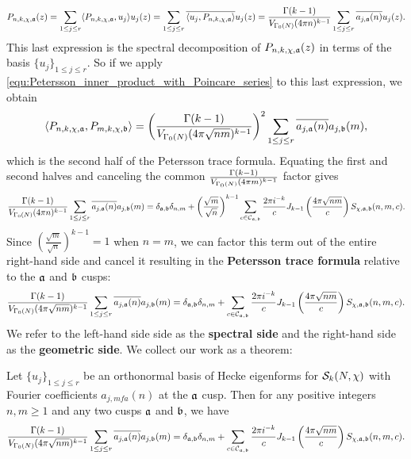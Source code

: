     \[
      P_{n,k,\chi,\mathfrak{a}}(z) = \sum_{1 \le j \le r}\langle P_{n,k,\chi,\mathfrak{a}},u_{j}\rangle u_{j}(z) = \sum_{1 \le j \le r}\overline{\langle u_{j},P_{n,k,\chi,\mathfrak{a}}\rangle}u_{j}(z) = \frac{\Gamma(k-1)}{V_{\Gamma_{0}(N)}(4\pi n)^{k-1}}\sum_{1 \le j \le r}\overline{a_{j,\mathfrak{a}}(n)}u_{j}(z).
    \]
    This last expression is the spectral decomposition of $P_{n,k,\chi,\mathfrak{a}}(z)$ in terms of the basis $\{u_{j}\}_{1 \le j \le r}$. So if we apply \cref{equ:Petersson_inner_product_with_Poincare_series} to this last expression, we obtain
    \[
      \langle P_{n,k,\chi,\mathfrak{a}},P_{m,k,\chi,\mathfrak{b}}\rangle = \left(\frac{\Gamma(k-1)}{V_{\Gamma_{0}(N)}(4\pi \sqrt{nm})^{k-1}}\right)^{2}\sum_{1 \le j \le r}\overline{a_{j,\mathfrak{a}}(n)}a_{j,\mathfrak{b}}(m),
    \]
    which is the second half of the Petersson trace formula. Equating the first and second halves and canceling the common $\frac{\Gamma(k-1)}{V_{\Gamma_{0}(N)}(4\pi m)^{k-1}}$ factor gives
    \[
      \frac{\Gamma(k-1)}{V_{\Gamma_{0}(N)}(4\pi n)^{k-1}}\sum_{1 \le j \le r}\overline{a_{j,\mathfrak{a}}(n)}a_{j,\mathfrak{b}}(m) = \delta_{\mathfrak{a},\mathfrak{b}}\delta_{n,m}+\left(\frac{\sqrt{m}}{\sqrt{n}}\right)^{k-1}\sum_{c \in \mathcal{C}_{\mathfrak{a},\mathfrak{b}}}\frac{2\pi i^{-k}}{c}J_{k-1}\left(\frac{4\pi\sqrt{nm}}{c}\right)S_{\chi,\mathfrak{a},\mathfrak{b}}(n,m,c).
    \]
    Since $\left(\frac{\sqrt{m}}{\sqrt{n}}\right)^{k-1} = 1$ when $n = m$, we can factor this term out of the entire right-hand side and cancel it resulting in the \textbf{Petersson trace formula} relative to the $\mathfrak{a}$ and $\mathfrak{b}$ cusps:
    \[
      \frac{\Gamma(k-1)}{V_{\Gamma_{0}(N)}(4\pi \sqrt{nm})^{k-1}}\sum_{1 \le j \le r}\overline{a_{j,\mathfrak{a}}(n)}a_{j,\mathfrak{b}}(m) = \delta_{\mathfrak{a},\mathfrak{b}}\delta_{n,m}+\sum_{c \in \mathcal{C}_{\mathfrak{a},\mathfrak{b}}}\frac{2\pi i^{-k}}{c}J_{k-1}\left(\frac{4\pi\sqrt{nm}}{c}\right)S_{\chi,\mathfrak{a},\mathfrak{b}}(n,m,c).
    \]
    We refer to the left-hand side side as the \textbf{spectral side} and the right-hand side as the \textbf{geometric side}. We collect our work as a theorem:

    \begin{theorem}
      Let $\{u_{j}\}_{1 \le j \le r}$ be an orthonormal basis of Hecke eigenforms for $\mathcal{S}_{k}(N,\chi)$ with Fourier coefficients $a_{j,
      mf{a}}(n)$ at the $\mathfrak{a}$ cusp. Then for any positive integers $n,m \ge 1$ and any two cusps $\mathfrak{a}$ and $\mathfrak{b}$, we have
      \[
        \frac{\Gamma(k-1)}{V_{\Gamma_{0}(N)}(4\pi \sqrt{nm})^{k-1}}\sum_{1 \le j \le r}\overline{a_{j,\mathfrak{a}}(n)}a_{j,\mathfrak{b}}(m) = \delta_{\mathfrak{a},\mathfrak{b}}\delta_{n,m}+\sum_{c \in \mathcal{C}_{\mathfrak{a},\mathfrak{b}}}\frac{2\pi i^{-k}}{c}J_{k-1}\left(\frac{4\pi\sqrt{nm}}{c}\right)S_{\chi,\mathfrak{a},\mathfrak{b}}(n,m,c).
      \]
    \end{theorem}

